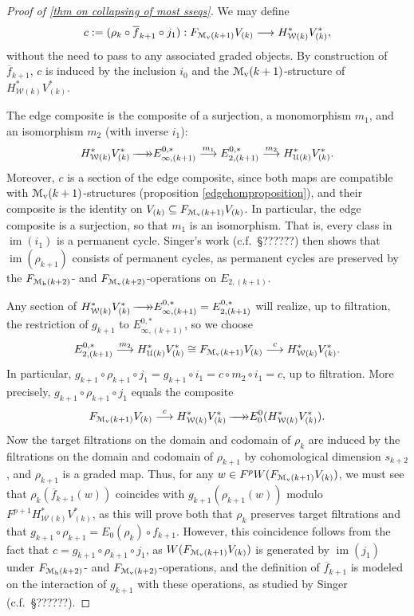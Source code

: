 \documentclass[11pt]{amsart}
\theoremstyle{plain}
\theoremstyle{definition}
\DeclareMathOperator{\im}{im}
\renewcommand{\to}{\longrightarrow}
\newcommand{\calW}{\mathcal{W}}
\newcommand{\calU}{\mathcal{U}}
\newcommand{\calM}{\mathcal{M}}
\theoremstyle{plain}
\newcommand{\epi}{{\,\makebox[0cm][l]{\ensuremath\to}\to}}
\begin{document}
\begin{Calculations of HWn for n nonzero}
\begin{proof}[Proof of \ref{thm on collapsing of most sseqs}]
 We may define 
\[c:=(\rho_k\circ \overline{f}_{k+1}\circ j_1):F_{\calM_\textup{v}(k+1)}V_{(k)}\to H_{\calW(k)}^{*}V^{*}_{(k)},\]
without the need to pass to any associated graded objects. By construction of $\overline{f}_{k+1}$,  $c$ is induced by the inclusion $i_0$ and the $\calM_\textup{v}(k+1)$-structure of $H^{*}_{\calW(k)}V^{*}_{(k)}$.

The edge composite is the composite of a surjection, a monomorphism $m_1$, and an isomorphism $m_2$ (with inverse $i_1$):
\[H^*_{\calW(k)}V^*_{(k)}\epi E_{\infty,(k+1)}^{0,*}\overset{m_1}{\to}E_{2,(k+1)}^{0,*}\overset{m_2}{\to}H^*_{\calU(k)}V^*_{(k)}.\]
Moreover, $c$ is a section of the edge composite, since both maps are compatible with $\calM_\textup{v}(k+1)$-structures (proposition \ref{edgehomproposition}), and their composite is the identity on $V_{(k)}\subseteq  F_{\calM_\textup{v}(k+1)}V_{(k)}$.
In particular, the edge composite is a surjection, so that $m_{1}$ is an isomorphism. That is, every class in $\im(i_1)$ is a permanent cycle. Singer's work (c.f.\ \S??????) then shows that $\im(\rho_{k+1})$ consists of permanent cycles, as permanent cycles are preserved by the $F_{\calM_\textup{h}(k+2)}$- and $F_{\calM_\textup{v}(k+2)}$-operations on $E_{2,(k+1)}$.


Any section of $H^*_{\calW(k)}V^*_{(k)}\epi E_{\infty,(k+1)}^{0,*}=E_{2,(k+1)}^{0,*}$ will realize, up to filtration, the restriction of $g_{k+1}$ to $E_{\infty,(k+1)}^{0,*}$, so we choose
\[E_{2,(k+1)}^{0,*}\overset{m_2}{\to} H^*_{\calU(k)}V^*_{(k)}\cong F_{\calM_\textup{v}(k+1)}V_{(k)}\overset{c}{\to}H_{\calW(k)}^{*}V^{*}_{(k)}.\]
In particular, $g_{k+1}\circ \rho_{k+1}\circ j_1=g_{k+1}\circ i_1=c\circ m_2\circ i_1=c$, up to filtration. More precisely, $g_{k+1}\circ \rho_{k+1}\circ j_1$ equals the composite
\begin{gather*}
F_{\calM_\textup{v}(k+1)}V_{(k)}\overset{c}{\to} H_{\calW(k)}^{*}V^{*}_{(k)}\epi E_0^0(H_{\calW(k)}^{*}V^{*}_{(k)}).
\end{gather*}
Now the target filtrations on the domain and codomain of $\rho_k$ are induced by the filtrations on the domain and codomain of $\rho_{k+1}$ by cohomological dimension $s_{k+2}$, and $\rho_{k+1}$ is a graded map. Thus, for any $w\in F^pW(F_{\calM_\textup{v}(k+1)}V_{(k)})$, we must see that $\rho_k(\overline{f}_{k+1}(w))$ coincides with $g_{k+1}(\rho_{k+1}(w))$ modulo $F^{p+1}H_{\calW(k)}^{*}V^{*}_{(k)}$, as this will prove both that $\rho_k$ preserves target filtrations and that  $g_{k+1}\circ \rho_{k+1}=E_0(\rho_{k})\circ f_{k+1}$. However, this coincidence follows from the fact that $c=g_{k+1}\circ \rho_{k+1}\circ j_1$, as $W(F_{\calM_\textup{v}(k+1)}V_{(k)})$ is generated by $\im(j_1)$ under $F_{\calM_\textup{h}(k+2)}$- and $F_{\calM_\textup{v}(k+2)}$-operations, and the definition of $\overline{f}_{k+1}$ is modeled on the interaction of $g_{k+1}$ with these operations, as studied by Singer (c.f.\ \S??????).


\end{proof}
\end{Calculations of HWn for n nonzero}
\end{document}
